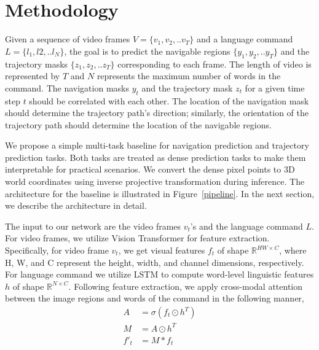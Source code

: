 \documentclass[letterpaper, 10 pt, conference]{ieeeconf}  %
\begin{document}

\section{Methodology}

Given a sequence of video frames $V = \{v_1, v_2,..v_T\}$ and a language command $L = \{l_1, l2,..l_N\}$, the goal is to predict the navigable regions $\{y_1, y_2,..y_T\}$ and the trajectory masks $\{z_1, z_2,..z_T\}$ corresponding to each frame. The length of video is represented by $T$ and $N$ represents the maximum number of words in the command. The navigation masks $y_t$ and the trajectory mask $z_t$ for a given time step $t$ should be correlated with each other. The location of the navigation mask should determine the trajectory path's direction; similarly, the orientation of the trajectory path should determine the location of the navigable regions.

We propose a simple multi-task baseline for navigation prediction and trajectory prediction tasks. Both tasks are treated as dense prediction tasks to make them interpretable for practical scenarios. We convert the dense pixel points to 3D world coordinates using inverse projective transformation during inference. The architecture for the baseline is illustrated in Figure~\ref{pipeline}. In the next section, we describe the architecture in detail.

The input to our network are the video frames $v_t$'s and the language command $L$. For video frames, we utilize Vision Transformer for feature extraction. Specifically, for video frame $v_t$, we get visual features $f_t$ of shape $ \mathbb R^{HW \times C}$, where H, W, and C represent the height, width, and channel dimensions, respectively. For language command we utilize LSTM to compute word-level linguistic features $h$ of shape $\mathbb R^{N \times C}$. Following feature extraction, we apply cross-modal attention between the image regions and words of the command in the following manner,
\begin{equation} \label{eq1}
\begin{split}
    A &= \sigma(f_t \odot h^T)\\
    M &= A \odot h^T\\
    f'_t &= M \ast f_t
\end{split}
\end{equation}
\end{document}
